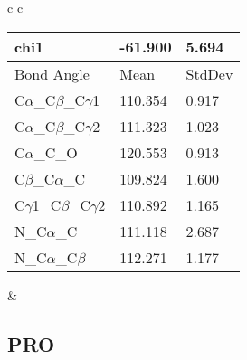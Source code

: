 \begin{longtable}{ c c }
\begin{tabular}{ l l l }
  chi1 & -61.900 & 5.694 \\ \midrule
  Bond Angle   & Mean     & StdDev \\ \midrule
  C$\alpha$\_C$\beta$\_C$\gamma$1 & 110.354 & 0.917\\
  C$\alpha$\_C$\beta$\_C$\gamma$2 & 111.323 & 1.023\\
  C$\alpha$\_C\_O & 120.553 & 0.913\\
  C$\beta$\_C$\alpha$\_C & 109.824 & 1.600\\
  C$\gamma$1\_C$\beta$\_C$\gamma$2 & 110.892 & 1.165\\
  N\_C$\alpha$\_C & 111.118 & 2.687\\
  N\_C$\alpha$\_C$\beta$ & 112.271 & 1.177\\
  \bottomrule
  \end{tabular}
  &
  \\
  
\end{longtable}    

\newpage
\subsection{PRO}

